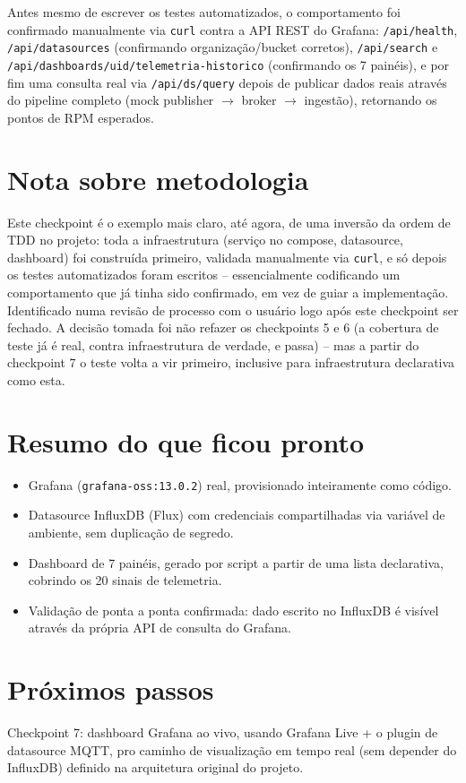 \documentclass[11pt,a4paper]{article}
\begin{document}
Antes mesmo de escrever os testes automatizados, o comportamento foi confirmado manualmente via \texttt{curl} contra a API REST do Grafana: \texttt{/api/health}, \texttt{/api/datasources} (confirmando organização/bucket corretos), \texttt{/api/search} e \texttt{/api/dashboards/uid/telemetria-historico} (confirmando os 7 painéis), e por fim uma consulta real via \texttt{/api/ds/query} depois de publicar dados reais através do pipeline completo (mock publisher $\to$ broker $\to$ ingestão), retornando os pontos de RPM esperados.

\section{Nota sobre metodologia}

Este checkpoint é o exemplo mais claro, até agora, de uma inversão da ordem de TDD no projeto: toda a infraestrutura (serviço no compose, datasource, dashboard) foi construída primeiro, validada manualmente via \texttt{curl}, e só depois os testes automatizados foram escritos -- essencialmente codificando um comportamento que já tinha sido confirmado, em vez de guiar a implementação. Identificado numa revisão de processo com o usuário logo após este checkpoint ser fechado. A decisão tomada foi não refazer os checkpoints 5 e 6 (a cobertura de teste já é real, contra infraestrutura de verdade, e passa) -- mas a partir do checkpoint 7 o teste volta a vir primeiro, inclusive para infraestrutura declarativa como esta.

\section{Resumo do que ficou pronto}

\begin{itemize}
    \item Grafana (\texttt{grafana-oss:13.0.2}) real, provisionado inteiramente como código.
    \item Datasource InfluxDB (Flux) com credenciais compartilhadas via variável de ambiente, sem duplicação de segredo.
    \item Dashboard de 7 painéis, gerado por script a partir de uma lista declarativa, cobrindo os 20 sinais de telemetria.
    \item Validação de ponta a ponta confirmada: dado escrito no InfluxDB é visível através da própria API de consulta do Grafana.
\end{itemize}

\section{Próximos passos}

Checkpoint 7: dashboard Grafana ao vivo, usando Grafana Live + o plugin de datasource MQTT, pro caminho de visualização em tempo real (sem depender do InfluxDB) definido na arquitetura original do projeto.
\end{document}
